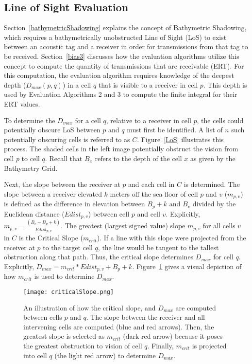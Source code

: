 \subsection {Line of Sight Evaluation}
\label{LoSAlgorithm}
Section~\ref{bathymetricShadowing} explains the concept of Bathymetric Shadowing, which requires a bathymetrically unobstructed Line of Sight (LoS) to exist between an acoustic tag and a receiver in order for transmissions from that tag to be received.  Section~\ref{bias3} discusses how the evaluation algorithms utilize this concept to compute the quantity of transmissions that are receivable (ERT).  For this computation, the evaluation algorithm requires knowledge of the deepest depth ($D_{max}(p,q)$) in a cell $q$ that is visible to a receiver in cell $p$.  This depth is used by Evaluation Algorithms 2 and 3 to compute the finite integral for their ERT values.

To determine the $D_{max}$ for a cell $q$, relative to a receiver in cell $p$, the cells could potentially obscure LoS between $p$ and $q$ must first be identified. A list of $n$ such potentially obscuring cells is referred to as $C$.   Figure~\ref{LoS} illustrates this process.  The shaded cells in the left image potentially obstruct the vision from cell $p$ to cell $q$.  Recall that $B_x$ refers to the depth of the cell $x$ as given by the Bathymetry Grid.

Next, the slope between the receiver at $p$ and each cell in $C$ is determined.  The slope between a receiver elevated $k$ meters off the sea floor of cell $p$ and $v$ ($m_{p,v}$) is defined as the difference in elevation between $B_p + k$ and $B_v$ divided by the Euclidean distance ($Edist_{p,v}$) between cell $p$ and cell $v$.  Explicitly, $m_{p,v} = \frac{(B_v - B_p + k)}{Edist_{p,v}}$.  The greatest (largest signed value) slope $m_{p,v}$ for all cells $v$ in $C$ is the Critical Slope ($m_{crit}$).  If a line with this slope were projected from the receiver at $p$ to the target cell $q$, the line would be tangent to the tallest obstruction along that path.  Thus, the critical slope determines $D_{max}$ for cell $q$.  Explicitly, $D_{max} = m_{crit} * Edist_{p,v} + B_p + k$.  Figure~\ref{LoSimage} gives a visual depiction of how $m_{crit}$ is used to determine $D_{max}$.

\begin{figure}[ht]
	\centering
	\texttt{[image: criticalSlope.png]}
	\caption{An illustration of how the critical slope, and $D_{max}$ are computed between cells $p$ and $q$.  The slope between the receiver and all intervening cells are computed (blue and red arrows).  Then, the greatest slope is selected as $m_{crit}$ (dark red arrow) because it poses the greatest obstruction to vision of cell $q$.  Finally, $m_{crit}$ is projected into cell $q$ (the light red arrow) to determine $D_{max}$.
		\label{LoSimage}}
\end{figure}


